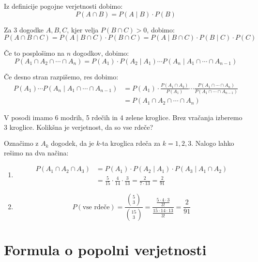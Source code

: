\documentclass[12pt]{book}
\def\n{\noindent}
\theoremstyle{definition}
\theoremstyle{plain}
\theoremstyle{plain}
\theoremstyle{plain}
\theoremstyle{remark}
\begin{document}
\n Iz definicije pogojne verjetnosti dobimo:
$$
P(A \cap B)=P(A \mid B) \cdot P(B)  
$$

\n Za 3 dogodke $A, B, C$, kjer velja $P(B \cap C)>0$, dobimo:
$$
P(A \cap B \cap C)=P(A \mid B \cap C) \cdot P(B \cap C)=P(A \mid B \cap C) \cdot P(B \mid C) \cdot P(C)
$$

\n Če to posplošimo na $n$ dogodkov, dobimo: 
$$
P\left(A_1 \cap A_2 \cap \cdots \cap A_n\right) =P\left(A_1\right) \cdot P\left(A_2 \mid A_1\right) \cdots P\left(A_n \mid A_1 \cap \cdots \cap A_{n-1}\right) 
$$

\n Če desno stran razpišemo, res dobimo: 
$$
\begin{aligned}
    P\left(A_1\right) \cdots P\left(A_n \mid A_1 \cap \cdots \cap A_{n-1}\right) &=P\left(A_1\right) \cdot \frac{P\left(A_1 \cap A_2\right)}{P\left(A_1\right)} \cdots \frac{P\left(A_1 \cap \cdots \cap A_n\right)}{P\left(A_1 \cap \cdots \cap A_{n-1}\right)} \\
    &=P\left(A_1 \cap A_2 \cap \cdots \cap A_n\right)
\end{aligned}
$$

\begin{zgled}
    V posodi imamo 6 modrih, 5 rdečih in 4 zelene kroglice. Brez vračanja izberemo 3 kroglice. Kolikšna je verjetnost, da so vse rdeče?

    Označimo z $A_k$ dogodek, da je $k$-ta kroglica rdeča za $k=1, 2, 3$. Nalogo lahko rešimo na dva načina:

    \begin{enumerate}
        \item 
        $$
        \begin{aligned}
            P\left(A_1 \cap A_2 \cap A_3\right) &=P\left(A_1\right) \cdot P\left(A_2 \mid A_1\right) \cdot P\left(A_3 \mid A_1 \cap A_2\right) \\
            &=\frac{5}{15} \cdot \frac{4}{14} \cdot \frac{3}{13}=\frac{2}{7 \cdot 13}=\frac{2}{91}
        \end{aligned}
        $$
        \item $$ P(\text{vse rdeče}) = \frac{\binom{5}{3}}{\binom{15}{3}}=\frac{\frac{5 \cdot 4 \cdot 3}{3 !}}{\frac{15 \cdot 14 \cdot 13}{3 !}}=\frac{2}{91} $$
    \end{enumerate}
\end{zgled}

\section{Formula o popolni verjetnosti}
\end{document}
